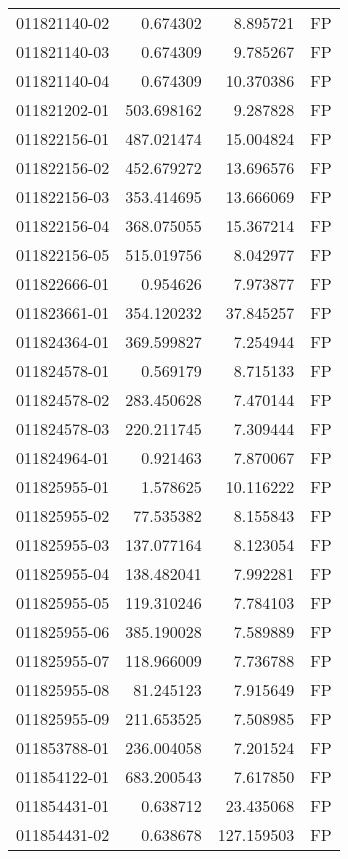 \begin{tabular}{lrrl}
011821140-02 &    0.674302 &     8.895721 &   FP \\
011821140-03 &    0.674309 &     9.785267 &   FP \\
011821140-04 &    0.674309 &    10.370386 &   FP \\
011821202-01 &  503.698162 &     9.287828 &   FP \\
011822156-01 &  487.021474 &    15.004824 &   FP \\
011822156-02 &  452.679272 &    13.696576 &   FP \\
011822156-03 &  353.414695 &    13.666069 &   FP \\
011822156-04 &  368.075055 &    15.367214 &   FP \\
011822156-05 &  515.019756 &     8.042977 &   FP \\
011822666-01 &    0.954626 &     7.973877 &   FP \\
011823661-01 &  354.120232 &    37.845257 &   FP \\
011824364-01 &  369.599827 &     7.254944 &   FP \\
011824578-01 &    0.569179 &     8.715133 &   FP \\
011824578-02 &  283.450628 &     7.470144 &   FP \\
011824578-03 &  220.211745 &     7.309444 &   FP \\
011824964-01 &    0.921463 &     7.870067 &   FP \\
011825955-01 &    1.578625 &    10.116222 &   FP \\
011825955-02 &   77.535382 &     8.155843 &   FP \\
011825955-03 &  137.077164 &     8.123054 &   FP \\
011825955-04 &  138.482041 &     7.992281 &   FP \\
011825955-05 &  119.310246 &     7.784103 &   FP \\
011825955-06 &  385.190028 &     7.589889 &   FP \\
011825955-07 &  118.966009 &     7.736788 &   FP \\
011825955-08 &   81.245123 &     7.915649 &   FP \\
011825955-09 &  211.653525 &     7.508985 &   FP \\
011853788-01 &  236.004058 &     7.201524 &   FP \\
011854122-01 &  683.200543 &     7.617850 &   FP \\
011854431-01 &    0.638712 &    23.435068 &   FP \\
011854431-02 &    0.638678 &   127.159503 &   FP \\

\end{tabular}
